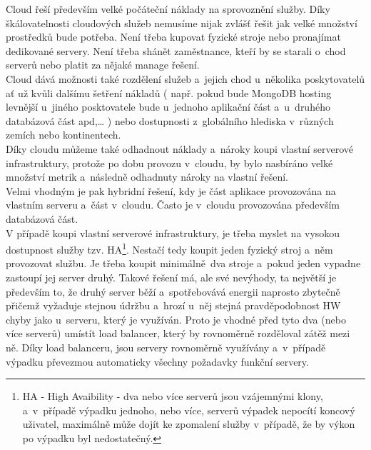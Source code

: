 \documentclass[a4paper,12pt,twoside,BCOR=10mm]{article}
\begin{document}
Cloud řeší především velké počáteční náklady na sprovoznění služby. Díky škálovatelnosti cloudových služeb nemusíme nijak zvlášť řešit jak velké množství prostředků bude potřeba. Není třeba kupovat fyzické stroje nebo pronajímat dedikované servery. Není třeba shánět zaměstnance, kteří by se starali o~chod serverů nebo platit za nějaké manage řešení.\\

Cloud dává možnosti také rozdělení služeb a~jejich chod u~několika poskytovatelů ať už kvůli dalšímu šetření nákladů ( např. pokud bude MongoDB hosting levnější u~jiného posktovatele bude u~jednoho aplikační část a~u~druhého databázová část apd,… ) nebo dostupnosti z~globálního hlediska v~různých zemích nebo kontinentech.\\

Díky cloudu můžeme také odhadnout náklady a~nároky koupi vlastní serverové infrastruktury, protože po dobu provozu v~cloudu, by bylo nasbíráno velké množství metrik a~následně odhadnuty nároky na vlastní řešení.\\

Velmi vhodným je pak hybridní řešení, kdy je část aplikace provozována na vlastním serveru a~část v~cloudu. Často je v~cloudu provozována především databázová část. \\

V případě koupi vlastní serverové infrastruktury, je třeba myslet na vysokou dostupnost služby tzv. HA\footnote{HA - High Avaibility - dva nebo více serverů jsou vzájemnými klony, a~v~případě výpadku jednoho, nebo více, serverů výpadek nepocítí koncový uživatel, maximálně může dojít ke zpomalení služby v~případě, že by výkon po výpadku byl nedostatečný.}. Nestačí tedy koupit jeden fyzický stroj a~něm provozovat službu. Je třeba koupit minimálně dva stroje a~pokud jeden vypadne zastoupí jej server druhý. Takové řešení má, ale své nevýhody, ta největší je především to, že druhý server běží a~spotřebovává energii naprosto zbytečně přičemž vyžaduje stejnou údržbu a~hrozí u~něj stejná pravděpodobnost HW chyby jako u~serveru, který je využíván. Proto je vhodné před tyto dva (nebo více serverů) umístít load balancer, který by rovnoměrně rozděloval zátěž mezi ně. Díky load balanceru, jsou servery rovnoměrně využívány a~v~případě výpadku převezmou automaticky všechny požadavky funkční servery.\\
\end{document}
